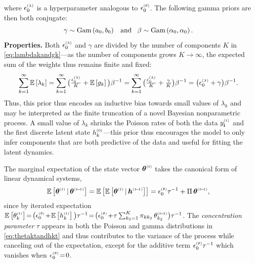 \documentclass{article}
\begin{document}
where $\epslambda$ is a hyperparameter analogous to $\epstheta$. The following gamma priors are then both conjugate:~
\begin{equation}
\gamma \sim \textrm{Gam}\left( a_0,b_0 \right) \,\,\,\textrm{ and }\,\,\, \beta \sim \textrm{Gam}\left( \alpha_0, \alpha_0 \right).
\end{equation}
\textbf{Properties.}
Both $\epslambda$ and $\gamma$ are divided by the number of components $K$ in \cref{eq:lambdakandgk}---as the number of components grows $K \!\rightarrow\! \infty$, the expected sum of the weights thus remains finite and fixed:~
\begin{equation}
\sum_{k=1}^\infty \E{\lambda_k} = \sum_{k=1}^\infty \big(\tfrac{\epslambda}{K} + \E{g_k}\big) \beta^{-1} = \sum_{k=1}^\infty \big(\tfrac{\epslambda}{K} + \tfrac{\gamma}{K} \big)\beta^{-1} = \big(\epslambda + \gamma \big)\beta^{-1}.
\end{equation}
Thus, this prior thus encodes an inductive bias towards small values of $\lambda_k$ and may be interpreted as the finite truncation of a novel Bayesian nonparametric process. A small value of $\lambda_k$ shrinks the Poisson rates of both the data $\ydt$ and the first discrete latent state $h^{\mathsmaller{(0)}}_k$---this prior thus encourages the model to only infer components that are both predictive of the data and useful for fitting the latent dynamics.~

The marginal expectation of the state vector $\boldsymbol{\theta}^{\mathsmaller{(t)}}$ takes the canonical form of linear dynamical systems,~
\begin{align}
\label{eq:expectation}
\mathbb{E}\left[\boldsymbol{\theta}^{\mathsmaller{(t)}} \given \boldsymbol{\theta}^{\mathsmaller{(t \tm 1)}}\right] = \mathbb{E}\left[\mathbb{E}\left[\boldsymbol{\theta}^{\mathsmaller{(t)}} \given \boldsymbol{h}^{\mathsmaller{(t \tm 1)}}\right]\right] = \epstheta \tau^{-1} + \Pi \, \boldsymbol{\theta}^{\mathsmaller{(t \tm 1)}},
\end{align}
since by iterated expectation $\E{\thetakt} \teq \big(\epstheta \tp \E{\hkt}\big)\tau^{-1} \teq \big(\epstheta \tp \tau \sum_{k_2 = 1}^K \pi_{kk_2} \,\thetakttm \big) \tau^{-1}$. The \emph{concentration parameter} $\tau$ appears in both the Poisson and gamma distributions in \cref{eq:thetaktandhkt} and thus contributes to the variance of the process while canceling out of the expectation, except for the additive term $\epstheta \tau^{-1}$ which vanishes when $\epstheta \teq 0$.
\end{document}
